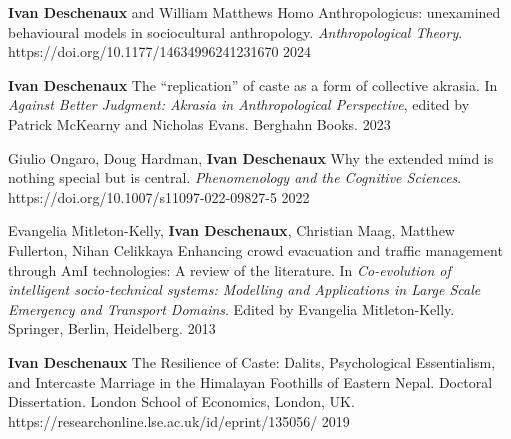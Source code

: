 
\begin{cvpublications}

  \cvpublication
  {\textbf{Ivan Deschenaux} and William Matthews}
  {Homo Anthropologicus: unexamined behavioural models in sociocultural anthropology. \textit{Anthropological Theory}. https://doi.org/10.1177/14634996241231670} %
  {2024} %

  \cvpublication
  {\textbf{Ivan Deschenaux}}
  {The ``replication'' of caste as a form of collective akrasia. In \textit{Against Better Judgment: Akrasia in Anthropological Perspective}, edited by Patrick McKearny and Nicholas Evans. Berghahn Books.} %
  {2023} %


  \cvpublication
  {Giulio Ongaro, Doug Hardman, \textbf{Ivan Deschenaux}}
  {Why the extended mind is nothing special but is central. \textit{Phenomenology and the Cognitive Sciences}. https://doi.org/10.1007/s11097-022-09827-5} %
  {2022} %

  \cvpublication
  {Evangelia Mitleton-Kelly, \textbf{Ivan Deschenaux}, Christian Maag, Matthew Fullerton, Nihan Celikkaya}
  {Enhancing crowd evacuation and traffic management through AmI technologies: A review of the literature. In \textit{Co-evolution of intelligent socio-technical systems: Modelling and Applications in Large Scale Emergency and Transport Domains}. Edited by Evangelia Mitleton-Kelly. Springer, Berlin, Heidelberg.} %
  {2013} %

\end{cvpublications}



\begin{cvpublications}

  \cvpublication
  {\textbf{Ivan Deschenaux}}
  {The Resilience of Caste: Dalits, Psychological Essentialism, and Intercaste Marriage in the Himalayan Foothills of Eastern Nepal. Doctoral Dissertation. London School of Economics, London, UK. https://researchonline.lse.ac.uk/id/eprint/135056/} %
  {2019} %

\end{cvpublications}

